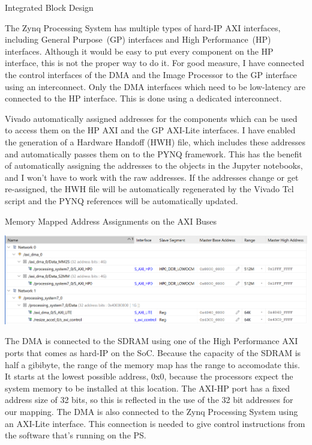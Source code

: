 \documentclass{matthijs}
\begin{document}
\begin{hoofdstuk}{Integrated Block Design}
		\bigskip

		The Zynq Processing System has multiple types of hard-IP AXI interfaces, including General Purpose~(GP) interfaces and High Performance~(HP) interfaces.
		Although it would be easy to put every component on the HP interface, this is not the proper way to do it.
		For good measure, I have connected the control interfaces of the DMA and the Image Processor to the GP interface using an interconnect.
		Only the DMA interfaces which need to be low-latency are connected to the HP interface.
		This is done using a dedicated interconnect.

		\bigskip

		Vivado automatically assigned addresses for the components which can be used to access them on the HP AXI and the GP AXI-Lite interfaces.
		I have enabled the generation of a Hardware Handoff (HWH) file, which includes these addresses and automatically passes them on to the PYNQ framework.
		This has the benefit of automatically assigning the addresses to the objects in the Jupyter notebooks, and I won't have to work with the raw addresses.
		If the addresses change or get re-assigned, the HWH file will be automatically regenerated by the Vivado Tcl script and the PYNQ references will be automatically updated.

		\begin{figuur}{Memory Mapped Address Assignments on the AXI Buses}

			\centerline{
				\includegraphics[width=1.1\textwidth, clip, trim=2pt 0 0 2pt]{vivado-bd-address-map-bad-quality.png}
			}

		\end{figuur}
		
		\bigskip

		The DMA is connected to the SDRAM using one of the High Performance AXI ports that comes as hard-IP on the SoC.
		Because the capacity of the SDRAM is half a gibibyte, the range of the memory map has the range to accomodate this.
		It starts at the lowest possible address, 0x0, because the processors expect the system memory to be installed at this location.
		The AXI-HP port has a fixed address size of 32 bits, so this is reflected in the use of the 32 bit addresses for our mapping.
		The DMA is also connected to the Zynq Processing System using an AXI-Lite interface.
		This connection is needed to give control instructions from the software that's running on the PS.


\end{hoofdstuk}
\end{document}
